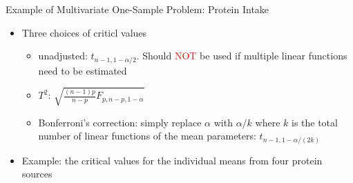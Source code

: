 \documentclass[
  ignorenonframetext,
]{beamer}
\providecommand{\tightlist}{%
  \setlength{\itemsep}{0pt}\setlength{\parskip}{0pt}}
\begin{document}
\begin{frame}{Example of Multivariate One-Sample Problem: Protein
Intake}
\protect\hypertarget{example-of-multivariate-one-sample-problem-protein-intake-8}{}
\begin{itemize}
\tightlist
\item
  Three choices of criticl values

  \begin{itemize}
  \tightlist
  \item
    unadjusted: \(t_{n-1, 1-\alpha/2}\). Should \textcolor{red}{NOT} be
    used if multiple linear functions need to be estimated
  \item
    \(T^2\): \(\sqrt{\frac{(n-1)p}{n-p}F_{p, n-p, 1-\alpha}}\)
  \item
    Bonferroni's correction: simply replace \(\alpha\) with \(\alpha/k\)
    where \(k\) is the total number of linear functions of the mean
    parameters: \(t_{n-1, 1-\alpha/(2k)}\)
  \end{itemize}
\item
  Example: the critical values for the individual means from four
  protein sources
\end{itemize}
\end{frame}
\end{document}
